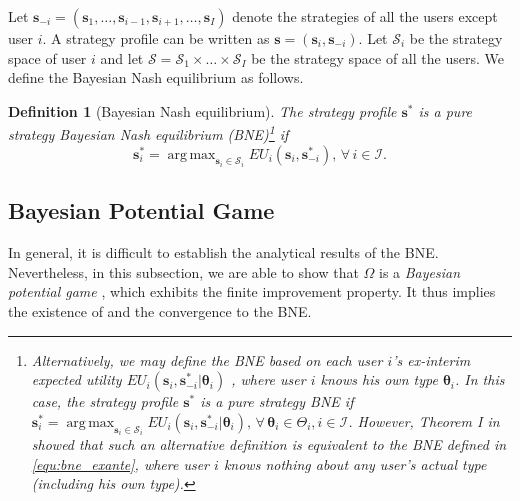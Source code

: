\documentclass[journal]{IEEEtran}
\newcommand{\mc}[1]{\mathcal{#1}}
\newcommand{\bs}[1]{\boldsymbol{#1}}
\DeclareMathOperator*{\argmax}{arg\,max}
\newtheorem{definition}{Definition}
\begin{document}
  Let $\boldsymbol{s}_{-i} = (\boldsymbol{s}_1, \ldots, \boldsymbol{s}_{i-1}, \boldsymbol{s}_{i+1}, \ldots, \boldsymbol{s}_I)$ denote the strategies of all the users except user $i$. A strategy profile can be written as $\boldsymbol{s} = (\boldsymbol{s}_i, \boldsymbol{s}_{-i})$.
  Let $\mathcal{S}_i$ be the strategy space of user $i$ and let $\mathcal{S} = \mathcal{S}_1 \times \ldots \times \mathcal{S}_I$ be the strategy space of all the users.
  We define the Bayesian Nash equilibrium \cite{shoham_ma08} as follows.
	
\begin{definition}[Bayesian Nash equilibrium]	 \label{def:bayesianne}
  The strategy profile $\boldsymbol{s}^*$ is a pure strategy Bayesian Nash equilibrium (BNE)\footnote{Alternatively, we may define the BNE based on each user $i$'s \emph{ex-interim} expected utility $EU_i(\bs{s}_i, \bs{s}_{-i}^*|\bs{\theta}_i)$ \cite{shoham_ma08}, where user $i$ knows his own type $\bs{\theta}_i$. In this case, the strategy profile $\boldsymbol{s}^*$ is a pure strategy BNE if $\bs{s}_i^* = \argmax_{\bs{s}_i \in \mc{S}_i} EU_i(\bs{s}_i, \bs{s}_{-i}^*|\bs{\theta}_i), \, \forall \, \bs{\theta}_i \in \Theta_i, i \in \mathcal{I}$. However, Theorem I in \cite{harsanyi_gw68} showed that such an alternative definition is equivalent to the BNE defined in \eqref{equ:bne_exante}, where user $i$ knows nothing about any user's actual type (including his own type).} if
%
\begin{equation} \label{equ:bne_exante}
	\bs{s}_i^* = \argmax_{\bs{s}_i \in \mc{S}_i} EU_i(\bs{s}_i, \bs{s}_{-i}^*), \, \forall \, i \in \mathcal{I}.	
\end{equation}
% 	
\end{definition}	


\subsection{Bayesian Potential Game} \label{sec:game_bayesian}

  In general, it is difficult to establish the analytical results of the BNE. %
  Nevertheless, in this subsection, we are able to show that $\Omega$ is a \emph{Bayesian potential game} \cite{facchini_cm97}, which exhibits the finite improvement property. It thus implies the existence of and the convergence to the BNE.
	
\end{document}
